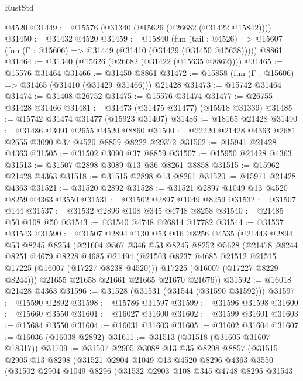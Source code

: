 \begin{lexlean}{RustStd}
\begin{coremodule}
    @4520
@31449 := @15576 (@31340 (@15626 (@26682 (@31422 @15842))))
@31450 := @31432 @4520
@31459 := @15840
    (fun (tail : @4526) => @15607 (fun (Γ : @15606) => @31449 (@31410 (@31429 (@31450 @15638)))))
    @8861
@31464 := @31340 (@15626 (@26682 (@31422 (@15635 @8862))))
@31465 := @15576 @31464
@31466 := @31450 @8861
@31472 := @15858 (fun (Γ : @15606) => @31465 (@31410 (@31429 @31466))) @21428
@31473 := @15742 @31464
@31474 := @31408 @26752
@31475 := @15576 @31474
@31477 := @26755 @31428 @31466
@31481 := @31473 (@31475 @31477) (@15918 @31339)
@31485 := @15742 @31474 @31477 (@15923 @31407)
@31486 := @18165 @21428
@31490 := @31486 @3091 @2655 @4520 @8860
@31500 := @22220 @21428 @4363 @2681 @2655 @3090 @37 @4520 @8859 @8222 @29372
@31502 := @15941 @21428 @4363
@31505 := @31502 @3090 @37 @8859
@31507 := @15950 @21428 @4363
@31513 := @31507 @2898 @3089 @13 @36 @8261 @8858
@31515 := @15962 @21428 @4363
@31518 := @31515 @2898 @13 @8261
@31520 := @15971 @21428 @4363
@31521 := @31520 @2892
@31528 := @31521 @2897 @1049 @13 @4520 @8259 @4363 @3550
@31531 := @31502 @2897 @1049 @8259
@31532 := @31507 @144
@31537 := @31532 @2896 @108 @345 @4748 @8258
@31540 := @21485 @50 @108 @50
@31543 := @31540 @4748 @26814 @17782
@31544 := @31537 @31543
@31590 := @31507
    @2894
    @130
    @53
    @16
    @8256
    @4535
    (@21443
      @2894
      @53
      @8245
      @8254
      (@21604
        @567
        @346
        @53
        @8245
        @8252
        @5628
        (@21478
          @8244
          @8251
          @4679
          @8228
          @4685
          @21494
          (@21503 @8237 @4685 @21512 @21515 @17225 (@16007 (@17227 @8238 @4520)))
          @17225
          (@16007 (@17227 @8229 @8244)))
        @21655
        @21658
        @21661
        @21665
        @21670
        @21676))
@31592 := @16018 @21428 @4363
@31596 := @31528 (@31531 (@31544 (@31590 @31592)))
@31597 := @15590 @2892
@31598 := @15786 @31597
@31599 := @31596 @31598
@31600 := @15660 @3550
@31601 := @16027 @31600
@31602 := @31599 @31601
@31603 := @15684 @3550
@31604 := @16031 @31603
@31605 := @31602 @31604
@31607 := @16036 (@16038 @2892)
@31611 := @31513 (@31518 (@31605 @31607 @18317))
@31709 := @31507
    @2905
    @3088
    @13
    @35
    @8298
    @8857
    (@31515
      @2905
      @13
      @8298
      (@31521
        @2904
        @1049
        @13
        @4520
        @8296
        @4363
        @3550
        (@31502
          @2904
          @1049
          @8296
          (@31532
            @2903
            @108
            @345
            @4748
            @8295
            @31543

\end{coremodule}
\end{lexlean}
